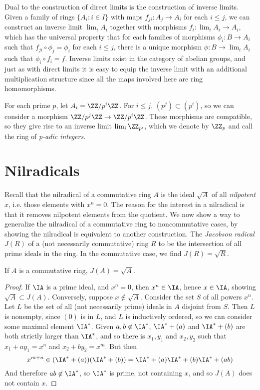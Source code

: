 Dual to the construction of direct limits is the construction of inverse limits. Given a family of rings $\{ A_i : i \in I \}$ with maps $f_{ji}: A_j \to A_i$ for each $i \leq j$, we can construct an inverse limit $\lim_i A_i$ together with morphisms $f_i: \lim_i A_i \to A_i$, which has the universal property that for each families of morphisms $\phi_i: B \to A_i$ such that $f_{ji} \circ \phi_j = \phi_i$ for each $i \leq j$, there is a unique morphism $\phi: B \to \lim_i A_i$ such that $\phi_i \circ f_i = f$. Inverse limits exist in the category of abelian groups, and just as with direct limits it is easy to equip the inverse limit with an additional multiplication structure since all the maps involved here are ring homomorphisms.

\begin{example}
    For each prime $p$, let $A_i = \ZZ/p^i \ZZ$. For $i \leq j$, $(p^j) \subset (p^i)$, so we can consider a morphism $\ZZ/p^j\ZZ \to \ZZ/p^i\ZZ$. These morphisms are compatible, so they give rise to an inverse limit $\lim_i \ZZ_{p^i}$, which we denote by $\ZZ_p$ and call the ring of \emph{p-adic integers}.
\end{example}

\section{Nilradicals}

Recall that the nilradical of a commutative ring $A$ is the ideal $\sqrt{A}$ of all {\it nilpotent} $x$, i.e. those elements with $x^n = 0$. The reason for the interest in a nilradical is that it removes nilpotent elements from the quotient. We now show a way to generalize the nilradical of a commutative ring to noncommutative cases, by showing the nilradical is equivalent to another construction. The \emph{Jacobson radical} $J(R)$ of a (not necessarily commutative) ring $R$ to be the intersection of all prime ideals in the ring. In the commutative case, we find $J(R) = \sqrt{R}$.

\begin{theorem}
    If $A$ is a commutative ring, $J(A) = \sqrt{A}$.
\end{theorem}
\begin{proof}
    If $\IA$ is a prime ideal, and $x^n = 0$, then $x^n \in \IA$, hence $x \in \IA$, showing $\sqrt{A} \subset J(A)$. Conversely, suppose $x \not \in \sqrt{A}$. Consider the set $S$ of all powers $x^n$. Let $L$ be the set of all (not necessarily prime) ideals in $A$ disjoint from $S$. Then $L$ is nonempty, since $(0)$ is in $L$, and $L$ is inductively ordered, so we can consider some maximal element $\IA^*$. Given $a,b \not \in \IA^*$, $\IA^* + (a)$ and $\IA^* + (b)$ are both strictly larger than $\IA^*$, and so there is $x_1,y_1$ and $x_2,y_2$ such that $x_1 + ay_1 = x^n$ and $x_2 + by_2 = x^m$. But then
    \[ x^{m+n} \in (\IA^* + (a))(\IA^* + (b)) = \IA^* + (a) \IA^* + (b) \IA^* + (ab) \]
    And therefore $ab \not \in \IA^*$, so $\IA^*$ is prime, not containing $x$, and so $J(A)$ does not contain $x$.
\end{proof}



